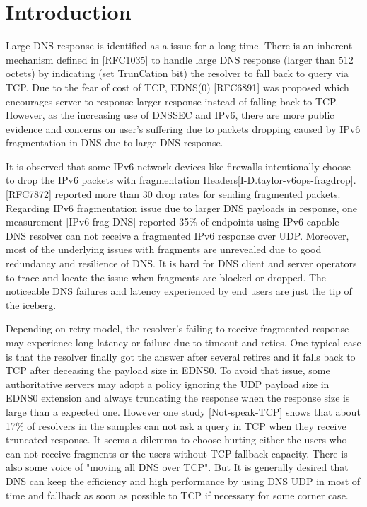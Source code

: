 \section{Introduction}



Large DNS response is identified as a issue for a long time.  There
is an inherent mechanism defined in [RFC1035] to handle large DNS
response (larger than 512 octets) by indicating (set TrunCation bit)
the resolver to fall back to query via TCP.  Due to the fear of cost
of TCP, EDNS(0) [RFC6891] was proposed which encourages server to
response larger response instead of falling back to TCP.  However, as
the increasing use of DNSSEC and IPv6, there are more public evidence
and concerns on user's suffering due to packets dropping caused by
IPv6 fragmentation in DNS due to large DNS response.

It is observed that some IPv6 network devices like firewalls
intentionally choose to drop the IPv6 packets with fragmentation
Headers[I-D.taylor-v6ops-fragdrop].  [RFC7872] reported more than 30%
drop rates for sending fragmented packets.  Regarding IPv6
fragmentation issue due to larger DNS payloads in response, one
measurement [IPv6-frag-DNS] reported 35\% of endpoints using
IPv6-capable DNS resolver can not receive a fragmented IPv6 response
over UDP.  Moreover, most of the underlying issues with fragments are
unrevealed due to good redundancy and resilience of DNS.  It is hard
for DNS client and server operators to trace and locate the issue
when fragments are blocked or dropped.  The noticeable DNS failures
and latency experienced by end users are just the tip of the iceberg.

Depending on retry model, the resolver's failing to receive
fragmented response may experience long latency or failure due to
timeout and reties.  One typical case is that the resolver finally
got the answer after several retires and it falls back to TCP after
deceasing the payload size in EDNS0.  To avoid that issue, some
authoritative servers may adopt a policy ignoring the UDP payload
size in EDNS0 extension and always truncating the response when the
response size is large than a expected one.  However one study
[Not-speak-TCP] shows that about 17\% of resolvers in the samples can
not ask a query in TCP when they receive truncated response.  It
seems a dilemma to choose hurting either the users who can not
receive fragments or the users without TCP fallback capacity.  There
is also some voice of "moving all DNS over TCP".  But It is generally
desired that DNS can keep the efficiency and high performance by
using DNS UDP in most of time and fallback as soon as possible to TCP
if necessary for some corner case.

